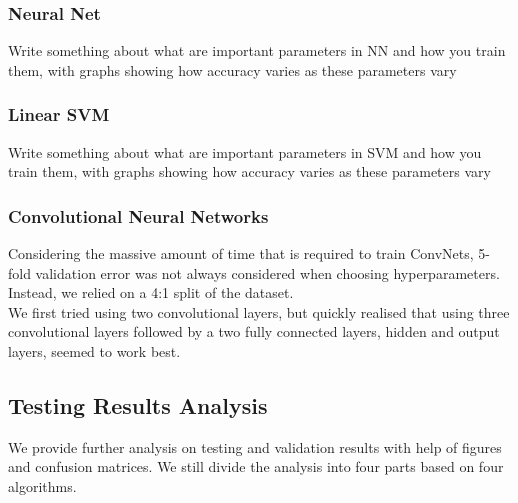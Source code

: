 \documentclass{acm_proc_article-sp}
\begin{document}
\subsubsection{Neural Net}
Write something about what are important parameters in NN and how you train them, with graphs showing how accuracy varies as these parameters vary

\subsubsection{Linear SVM }
Write something about what are important parameters in SVM and how you train them, with graphs showing how accuracy varies as these parameters vary

\subsubsection{Convolutional Neural Networks}
Considering the massive amount of time that is required to train ConvNets, 5-fold validation error was not always considered when choosing hyperparameters. Instead, we relied on a 4:1 split of the dataset. \\
We first tried using two convolutional layers, but quickly realised that using three convolutional layers followed by a two fully connected layers, hidden and output layers, seemed to work best.\\


\subsection{Testing Results Analysis}
We provide further analysis on testing and validation results with help of figures and confusion matrices. We still divide the analysis into four parts based on four algorithms.
\end{document}
